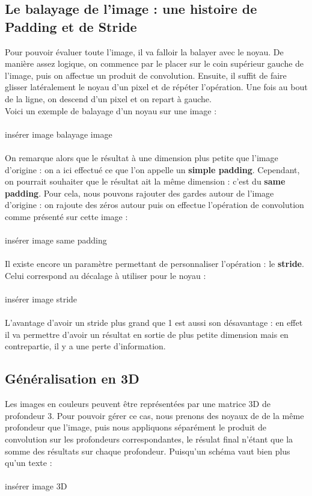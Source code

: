\subsection{Le balayage de l'image : une histoire de Padding et de Stride}

Pour pouvoir évaluer toute l'image, il va falloir la balayer avec le noyau. De manière assez logique, on commence par le placer sur le coin supérieur gauche de l'image, puis on affectue un produit de convolution. Ensuite, il suffit de faire glisser latéralement le noyau d'un pixel et de répéter l'opération. Une fois au bout de la ligne, on descend d'un pixel et on repart à gauche. \\
Voici un exemple de balayage d'un noyau sur une image : \\
\\
{insérer image balayage image}\\
\\
On remarque alors que le résultat à une dimension plus petite que l'image d'origine : on a ici effectué ce que l'on appelle un \textbf{simple padding}. Cependant, on pourrait souhaiter que le résultat ait la même dimension : c'est du \textbf{same padding}. Pour cela, nous pouvons rajouter des gardes autour de l'image d'origine : on rajoute des zéros autour puis on effectue l'opération de convolution comme présenté sur cette image :\\
\\
{insérer image same padding}\\
\\
Il existe encore un paramètre permettant de personnaliser l'opération : le \textbf{stride}. Celui correspond au décalage à utiliser pour le noyau :\\
\\
{insérer image stride}\\
\\ 
L'avantage d'avoir un stride plus grand que 1 est aussi son désavantage : en effet il va permettre d'avoir un résultat en sortie de plus petite dimension mais en contrepartie, il y a une perte d'information.

\subsection{Généralisation en 3D}

Les images en couleurs peuvent être représentées par une matrice 3D de profondeur 3. Pour pouvoir gérer ce cas, nous prenons des noyaux de de la même profondeur que l'image, puis nous appliquons séparément le produit de convolution sur les profondeurs correspondantes, le résulat final n'étant que la somme des résultats sur chaque profondeur. Puisqu'un schéma vaut bien plus qu'un texte :\\
\\
{insérer image 3D}\\
\\

